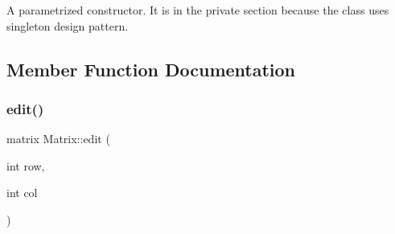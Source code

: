 A parametrized constructor. It is in the private section because the class uses singleton design pattern. 

\subsection{Member Function Documentation}
\mbox{\label{class_matrix_a34b2269a2b6d06c202439de2e64009ba}} 
\subsubsection{\texorpdfstring{edit()}{edit()}}
{\footnotesize\ttfamily matrix Matrix\+::edit (\begin{DoxyParamCaption}\item[{int}]{row,  }\item[{int}]{col }\end{DoxyParamCaption})}

